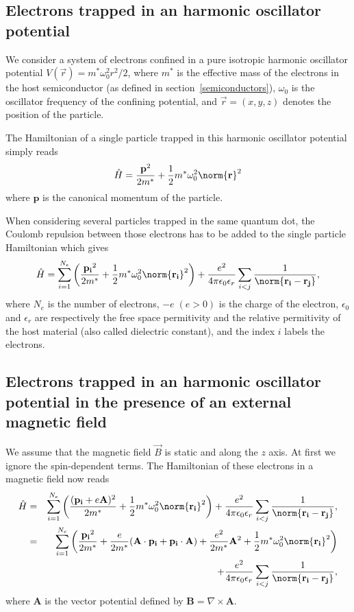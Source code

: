\subsection{Electrons trapped in an harmonic oscillator potential}
We consider a system of electrons confined in a pure isotropic harmonic oscillator potential $V(\vec{r})=m^* \omega_0^2 r^2/2$, where $m^*$ is the effective mass of the electrons in the host semiconductor (as defined in section~\ref{semiconductors}), $\omega_0$ is the oscillator frequency of the confining potential, and $\vec{r}=(x,y,z)$ denotes the position of the particle.

The Hamiltonian of a single particle trapped in this harmonic oscillator potential simply reads
\begin{equation}
  \hat{H}= \frac{\textbf{p}^2}{2m^*}  + \frac{1}{2} m^* \omega_0^2 \norm{\textbf{r}}^2
\end{equation}
where $\textbf{p}$ is the canonical momentum of the particle.

When considering several particles trapped in the same quantum dot, the Coulomb repulsion between those electrons has to be added to the single particle Hamiltonian which gives
\begin{equation}
\hat{H}=\sum_{i=1}^{N_e} \left( \frac{\mathbf{p_i}^2}{2m^*}+ \frac{1}{2} m^* \omega_0^2 \norm{\mathbf{r_i}}^2 \right) + \frac{e^2}{4 \pi \epsilon_0 \epsilon_r} \sum_{i<j} \frac{1}{\norm{\mathbf{r_i}-\mathbf{r_j}}},
\end{equation}
where $N_e$ is the number of electrons, $-e \;  (e>0)$ is the charge of the electron, $\epsilon_0$ and $\epsilon_r$ are respectively the free space permitivity and the relative permitivity of the host material (also called dielectric constant), and the index $i$ labels the electrons.

\subsection{Electrons trapped in an harmonic oscillator potential in the presence of an external magnetic field} 
We assume that the magnetic field $\overrightarrow{B}$ is static and along the $z$ axis.
At first we ignore the spin-dependent terms. The Hamiltonian of these electrons in a magnetic field now reads ~\cite{Bransden2003}
\begin{align}
  \hat{H}&=&\sum_{i=1}^{N_e}\left(  \frac{(\mathbf{p_i}+e\mathbf{A})^2}{2m^*}  + \frac{1}{2} m^* \omega_0^2 \norm{\mathbf{r_i}}^2  \right) + \frac{e^2}{4 \pi \epsilon_0 \epsilon_r} \sum_{i<j}\frac{1}{\norm{\mathbf{r_i}-\mathbf{r_j}}}, \\
&=&\sum_{i=1}^{N_e}\left(  \frac{\mathbf{p_i}^2}{2m^*} + \frac{e}{2m^*}(\mathbf{A}\cdot \mathbf{p_i}+\mathbf{p_i}\cdot \mathbf{A}) + \frac{e^2}{2m^*}\mathbf{A}^2  + \frac{1}{2} m^* \omega_0^2 \norm{\mathbf{r_i}}^2  \right) \\
& &+ \frac{e^2}{4 \pi \epsilon_0 \epsilon_r} \sum_{i<j}\frac{1}{\norm{\mathbf{r_i}-\mathbf{r_j}}},
\end{align}
where $\mathbf{A}$ is the vector potential defined by $\mathbf{B}=\nabla \times \mathbf{A}$.

